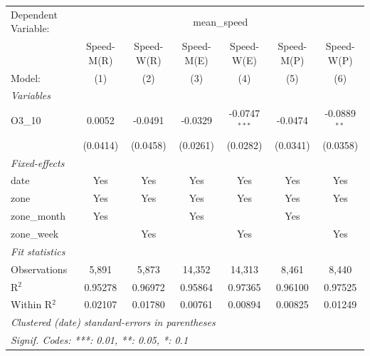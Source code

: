 \begingroup
\centering
\begin{tabular}{lcccccc}
   \tabularnewline \midrule \midrule
   Dependent Variable: & \multicolumn{6}{c}{mean\_speed}\\
                & Speed-M(R) & Speed-W(R) & Speed-M(E) & Speed-W(E)      & Speed-M(P) & Speed-W(P) \\   
   Model:       & (1)        & (2)        & (3)        & (4)             & (5)        & (6)\\  
   \midrule
   \emph{Variables}\\
   O3\_10       & 0.0052     & -0.0491    & -0.0329    & -0.0747$^{***}$ & -0.0474    & -0.0889$^{**}$\\   
                & (0.0414)   & (0.0458)   & (0.0261)   & (0.0282)        & (0.0341)   & (0.0358)\\   
   \midrule
   \emph{Fixed-effects}\\
   date         & Yes        & Yes        & Yes        & Yes             & Yes        & Yes\\  
   zone         & Yes        & Yes        & Yes        & Yes             & Yes        & Yes\\  
   zone\_month  & Yes        &            & Yes        &                 & Yes        & \\  
   zone\_week   &            & Yes        &            & Yes             &            & Yes\\  
   \midrule
   \emph{Fit statistics}\\
   Observations & 5,891      & 5,873      & 14,352     & 14,313          & 8,461      & 8,440\\  
   R$^2$        & 0.95278    & 0.96972    & 0.95864    & 0.97365         & 0.96100    & 0.97525\\  
   Within R$^2$ & 0.02107    & 0.01780    & 0.00761    & 0.00894         & 0.00825    & 0.01249\\  
   \midrule \midrule
   \multicolumn{7}{l}{\emph{Clustered (date) standard-errors in parentheses}}\\
   \multicolumn{7}{l}{\emph{Signif. Codes: ***: 0.01, **: 0.05, *: 0.1}}\\
\end{tabular}
\par\endgroup
